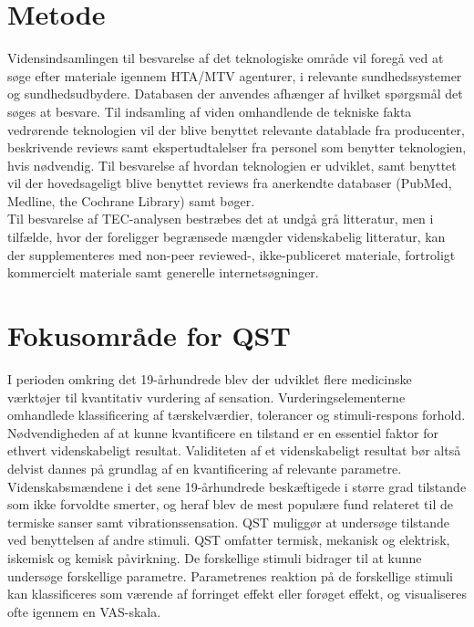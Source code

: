 \section{Metode \citep{HTAcore}}
Vidensindsamlingen til besvarelse af det teknologiske område vil foregå ved at søge efter materiale igennem HTA/MTV agenturer, i relevante sundhedssystemer og sundhedsudbydere. Databasen der anvendes afhænger af hvilket spørgsmål det søges at besvare. Til indsamling af viden omhandlende de tekniske fakta vedrørende teknologien vil der blive benyttet relevante datablade fra producenter, beskrivende reviews samt ekspertudtalelser fra personel som benytter teknologien, hvis nødvendig. Til besvarelse af hvordan teknologien er udviklet, samt benyttet vil der hovedsageligt blive benyttet reviews fra anerkendte databaser (PubMed, Medline, the Cochrane Library) samt bøger.  \\
Til besvarelse af TEC-analysen bestræbes det at undgå grå litteratur, men i tilfælde, hvor der foreligger begrænsede mængder videnskabelig litteratur, kan der supplementeres med non-peer reviewed-, ikke-publiceret materiale, fortroligt kommercielt materiale samt generelle internetsøgninger.


\section{Fokusområde for QST}
I perioden omkring det 19-århundrede blev der udviklet flere medicinske værktøjer til kvantitativ vurdering af sensation. Vurderingselementerne omhandlede klassificering af tærskelværdier, tolerancer og stimuli-respons forhold. Nødvendigheden af at kunne kvantificere en tilstand er en essentiel faktor for ethvert videnskabeligt resultat. Validiteten af et videnskabeligt resultat bør altså delvist dannes på grundlag af en kvantificering af relevante parametre. \citep{Yarnitsky2006} Videnskabsmændene i det sene 19-århundrede beskæftigede i større grad tilstande som ikke forvoldte smerter, og heraf blev de mest populære fund relateret til de termiske sanser samt vibrationssensation. \citep{Yarnitsky1997} QST muliggør at undersøge tilstande ved benyttelsen af andre stimuli. QST omfatter termisk, mekanisk og elektrisk, iskemisk og kemisk påvirkning. De forskellige stimuli bidrager til at kunne undersøge forskellige parametre. Parametrenes reaktion på de forskellige stimuli kan klassificeres som værende af forringet effekt eller forøget effekt, og visualiseres ofte igennem en VAS-skala. \citep{Yarnitsky2006}

